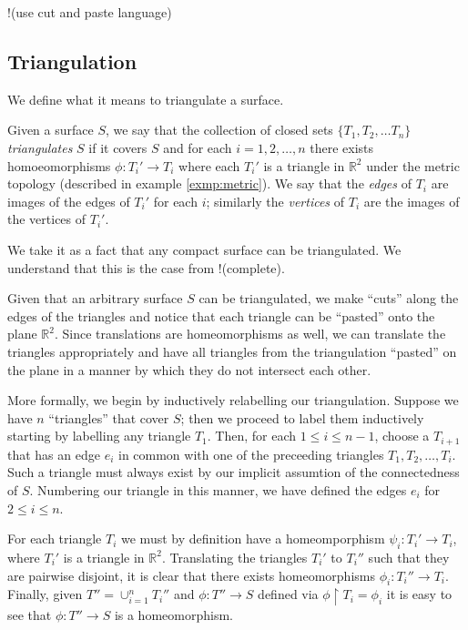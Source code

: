 !(use cut and paste language)

\subsection{Triangulation}
\label{sec:surf:triangulation}

We define what it means to triangulate a surface.

\begin{defn}
  Given a surface $S$, we say that the collection of closed sets $\{
  T_1,  T_2, \dots T_n \}$ \emph{triangulates} $S$ if it covers $S$
  and for each $i = 1,2, \dots, n$ there exists homoeomorphisms $\phi
  : T_i' \rightarrow T_i$ where each $T_i'$ is a triangle in
  $\mathbb{R}^2$ under the metric topology (described in example
  \ref{exmp:metric}). We say that the \emph{edges} of $T_i$ are images
  of the edges of $T_i'$ for each $i$; similarly the \emph{vertices}
  of $T_i$ are the images of the vertices of $T_i'$.
\end{defn}

We take it as a fact that any compact surface can be triangulated. We
understand that this is the case from !(complete).

Given that an arbitrary surface $S$ can be triangulated, we make
``cuts'' along the edges of the triangles and notice that each
triangle can be ``pasted'' onto the plane $\mathbb{R}^2$. Since
translations are homeomorphisms as well, we can translate the
triangles appropriately and have all triangles from the triangulation
``pasted'' on the plane in a manner by which they do not intersect
each other.

More formally, we begin by inductively relabelling our
triangulation. Suppose we have $n$ ``triangles'' that cover $S$; then
we proceed to label them inductively starting by labelling any
triangle $T_1$. Then, for each $1 \leq i \leq n-1$, choose a $T_{i+1}$
that has an edge $e_i$ in common with one of the preceeding
triangles $T_1, T_2, \dots, T_i$. Such a triangle must always exist by
our implicit assumtion of the connectedness of $S$. Numbering  our
triangle in this manner, we have defined the edges $e_i$ for $2 \leq i
\leq n$. 

For each triangle $T_i$ we must by definition have a homeomporphism
$\psi_i: T_i' \rightarrow T_i$, where $T_i'$ is a triangle in
$\mathbb{R}^2$. Translating the triangles $T_i'$ to $T_i''$ such that
they are pairwise disjoint, it is clear that there exists
homeomorphisms $\phi_i: T_i'' \rightarrow T_i$. Finally, given $T'' =
\cup_{i=1}^n T_i''$ and $\phi : T'' \rightarrow S$ defined via $\phi
\restriction T_i = \phi_i$ it is easy to see that $\phi : T''
\rightarrow S$ is a homeomorphism. 

